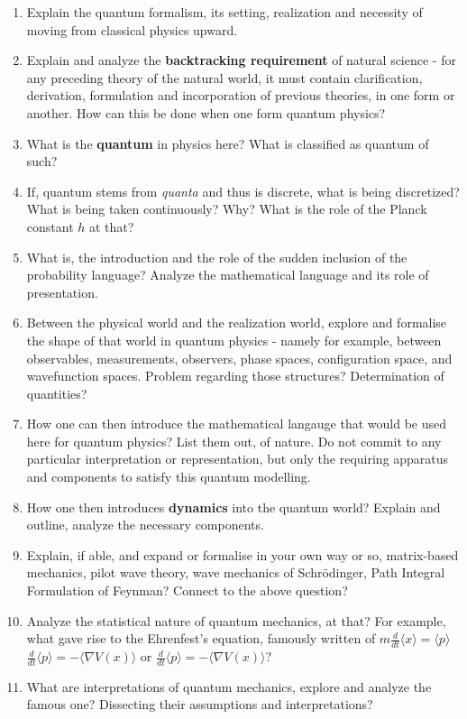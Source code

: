 \documentclass[10pt]{article}
\begin{document}
\begin{enumerate}[itemsep=1pt,topsep=1pt]
  \item Explain the quantum formalism, its setting, realization and necessity of moving from classical physics upward. 
  \item Explain and analyze the \textbf{backtracking requirement} of natural science - for any preceding theory of the natural world, it must contain clarification, derivation, formulation and incorporation of previous theories, in one form or another. How can this be done when one form quantum physics? 
  \item What is the \textbf{quantum} in physics here? What is classified as quantum of such? 
  \item If, quantum stems from \textit{quanta} and thus is discrete, what is being discretized? What is being taken continuously? Why? What is the role of the Planck constant $h$ at that? 
  \item What is, the introduction and the role of the sudden inclusion of the probability language? Analyze the mathematical language and its role of presentation. 
  \item Between the physical world and the realization world, explore and formalise the shape of that world in quantum physics - namely for example, between observables, measurements, observers, phase spaces, configuration space, and wavefunction spaces. Problem regarding those structures? Determination of quantities?
  \item How one can then introduce the mathematical langauge that would be used here for quantum physics? List them out, of nature. Do not commit to any particular interpretation or representation, but only the requiring apparatus and components to satisfy this quantum modelling. 
  \item How one then introduces \textbf{dynamics} into the quantum world? Explain and outline, analyze the necessary components. 
  \item Explain, if able, and expand or formalise in your own way or so, matrix-based mechanics, pilot wave theory, wave mechanics of Schrödinger, Path Integral Formulation of Feynman? Connect to the above question? 
  \item Analyze the statistical nature of quantum mechanics, at that? For example, what gave rise to the Ehrenfest's equation, famously written of \(m \frac{d}{dt} \langle x \rangle = \langle p \rangle\)\(\frac{d}{dt} \langle p \rangle = - \langle \nabla V(x) \rangle\) or \(\frac{d}{dt} \langle p \rangle = - \langle \nabla V(x) \rangle\)?
  \item What are interpretations of quantum mechanics, explore and analyze the famous one? Dissecting their assumptions and interpretations? 
\end{enumerate}
\end{document}
